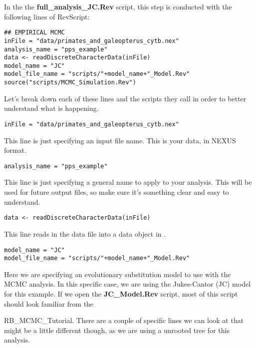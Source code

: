 In the the \textbf{full\_analysis\_JC.Rev} script, this step is conducted with the following lines of RevScript:

{\tt \begin{snugshade*}
\begin{lstlisting}
## EMPIRICAL MCMC
inFile = "data/primates_and_galeopterus_cytb.nex"
analysis_name = "pps_example"
data <- readDiscreteCharacterData(inFile)
model_name = "JC"
model_file_name = "scripts/"+model_name+"_Model.Rev"
source("scripts/MCMC_Simulation.Rev")
\end{lstlisting}
\end{snugshade*}}

Let's break down each of these lines and the scripts they call in order to better understand what is 
happening. 

{\tt \begin{snugshade*}
\begin{lstlisting}
inFile = "data/primates_and_galeopterus_cytb.nex"
\end{lstlisting}
\end{snugshade*}}

This line is just specifying an input file name. This is your data, in NEXUS format.

{\tt \begin{snugshade*}
\begin{lstlisting}
analysis_name = "pps_example"
\end{lstlisting}
\end{snugshade*}}

This line is just specifying a general name to apply to your analysis. This will be used for future output files, so make sure it's something clear and easy to understand.

{\tt \begin{snugshade*}
\begin{lstlisting}
data <- readDiscreteCharacterData(inFile)
\end{lstlisting}
\end{snugshade*}}

This line reads in the data file into a data object in \RevBayes. 

 
{\tt \begin{snugshade*}
\begin{lstlisting}
model_name = "JC"
model_file_name = "scripts/"+model_name+"_Model.Rev"
\end{lstlisting}
\end{snugshade*}}

Here we are specifying an evolutionary substitution model to use with the MCMC analysis. In this specific
case, we are using the Jukes-Cantor (JC) model for this example. If we open the \textbf{JC\_Model.Rev} 
script, most of this script should look familiar from the \item RB\_MCMC\_Tutorial. There are a couple of specific 
lines we can look at that might be a little different though, as we are using a unrooted tree for this
analysis. 

